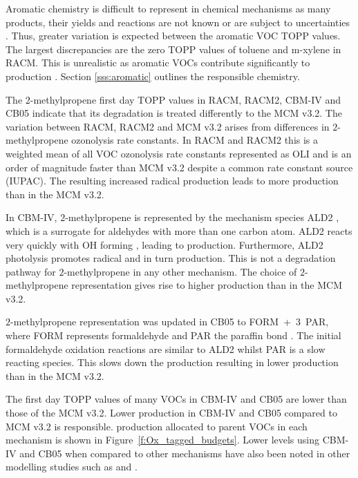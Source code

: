 Aromatic chemistry is difficult to represent in chemical mechanisms as many products, their yields and reactions are not known or are subject to uncertainties \citep{Vereecken:2012}. 
Thus, greater variation is expected between the aromatic VOC TOPP values.
The largest discrepancies are the zero TOPP values of toluene and m-xylene in RACM. 
This is unrealistic as aromatic VOCs contribute significantly to  production \citep{Derwent:1998}. 
Section \ref{sss:aromatic} outlines the responsible chemistry.

The $2$-methylpropene first day TOPP values in RACM, RACM2, CBM-IV and CB05 indicate that its degradation is treated differently to the MCM v3.2. 
The variation between RACM, RACM2 and MCM v3.2 arises from differences in $2$-methylpropene ozonolysis rate constants.
In RACM and RACM2 this is a weighted mean of all VOC ozonolysis rate constants represented as OLI \citep{Stockwell:1997, Goliff:2013} and is an order of magnitude faster than MCM v3.2 despite a common rate constant source (IUPAC).
The resulting increased radical production leads to more  production than in the MCM v3.2.

In CBM-IV, $2$-methylpropene is represented by the mechanism species ALD2 \citep{Hogo:1989}, which is a surrogate for aldehydes with more than one carbon atom. 
ALD2 reacts very quickly with OH forming , leading to  production. 
Furthermore, ALD2 photolysis promotes radical and in turn  production. 
This is not a degradation pathway for $2$-methylpropene in any other mechanism. 
The choice of $2$-methylpropene representation gives rise to higher  production than in the MCM v3.2.

$2$-methylpropene representation was updated in CB05 to \mbox{FORM + $3$ PAR}, where FORM represents formaldehyde and PAR the paraffin  bond \citep{Yarwood:2005}. 
The initial formaldehyde oxidation reactions are similar to ALD2 whilst PAR is a slow reacting species. 
This slows down the  production resulting in lower  production than in the MCM v3.2.

The first day TOPP values of many VOCs in CBM-IV and CB05 are lower than those of the MCM v3.2. 
Lower  production in CBM-IV and CB05 compared to MCM v3.2 is responsible.
 production allocated to parent VOCs in each mechanism is shown in \mbox{Figure \ref{f:Ox_tagged_budgets}}.
Lower  levels using CBM-IV and CB05 when compared to other mechanisms have also been noted in other modelling studies such as \citet{Luecken:2008, Emmerson:2009} and \citet{Saylor:2012}.

